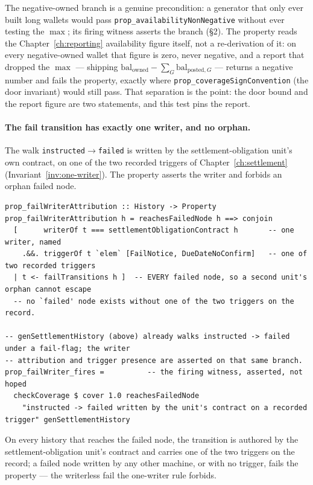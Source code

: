 The negative-owned branch is a genuine precondition: a generator that only ever built long wallets
would pass \texttt{prop\_availabilityNonNegative} without ever testing the $\max$; its firing
witness asserts the branch (\S 2). The property reads the Chapter~\ref{ch:reporting} availability
figure itself, not a re-derivation of it: on every negative-owned wallet that figure is zero, never
negative, and a report that dropped the $\max$ --- shipping $\mathrm{bal}_{\text{owned}}-\sum_G
\mathrm{bal}_{\text{posted},G}$ --- returns a negative number and fails the property, exactly where
\texttt{prop\_coverageSignConvention} (the door invariant) would still pass. That separation is the
point: the door bound and the report figure are two statements, and this test pins the report.

\paragraph{The fail transition has exactly one writer, and no orphan.}
The walk \texttt{instructed}$\to$\texttt{failed} is written by the settlement-obligation unit's
own contract, on one of the two recorded triggers of Chapter~\ref{ch:settlement}
(Invariant~\ref{inv:one-writer}). The property asserts the writer and forbids an orphan
failed node.

\begin{lstlisting}
prop_failWriterAttribution :: History -> Property
prop_failWriterAttribution h = reachesFailedNode h ==> conjoin
  [      writerOf t === settlementObligationContract h       -- one writer, named
    .&&. triggerOf t `elem` [FailNotice, DueDateNoConfirm]   -- one of two recorded triggers
  | t <- failTransitions h ]  -- EVERY failed node, so a second unit's orphan cannot escape
  -- no `failed' node exists without one of the two triggers on the record.

-- genSettlementHistory (above) already walks instructed -> failed under a fail-flag; the writer
-- attribution and trigger presence are asserted on that same branch.
prop_failWriter_fires =          -- the firing witness, asserted, not hoped
  checkCoverage $ cover 1.0 reachesFailedNode
    "instructed -> failed written by the unit's contract on a recorded trigger" genSettlementHistory
\end{lstlisting}

On every history that reaches the failed node, the transition is authored by the
settlement-obligation unit's contract and carries one of the two triggers on the record; a failed
node written by any other machine, or with no trigger, fails the property --- the writerless fail the
one-writer rule forbids.

